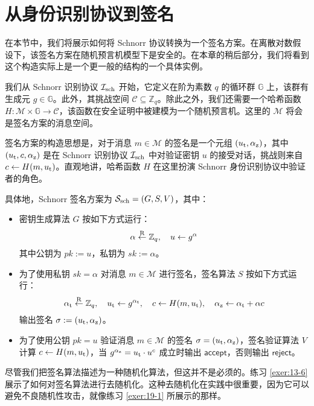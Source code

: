 \section{从身份识别协议到签名}\label{sec:19-2}

在本节中，我们将展示如何将 Schnorr 协议转换为一个签名方案。在离散对数假设下，该签名方案在随机预言机模型下是安全的。在本章的稍后部分，我们将看到这个构造实际上是一个更一般的结构的一个具体实例。

我们从 Schnorr 识别协议 $\mathcal{I}_{\rm sch}$ 开始，它定义在阶为素数 $q$ 的循环群 $\mathbb{G}$ 上，该群有生成元 $g\in\mathbb{G}$。此外，其挑战空间 $\mathcal{C}\subseteq\mathbb{Z}_q$。除此之外，我们还需要一个哈希函数 $H:\mathcal{M}\times\mathbb{G}\to\mathcal{C}$，该函数在安全证明中被建模为一个随机预言机。这里的 $\mathcal{M}$ 将会是签名方案的消息空间。

签名方案的构造思想是，对于消息 $m\in\mathcal{M}$ 的签名是一个元组 $(u_{\rm t},\alpha_{\rm z})$，其中 $(u_{\rm t},c,\alpha_{\rm z})$ 是在 Schnorr 识别协议 $\mathcal{I}_{\rm sch}$ 中对验证密钥 $u$ 的接受对话，挑战则来自 $c\leftarrow H(m,u_{\rm t})$。直观地讲，哈希函数 $H$ 在这里扮演 Schnorr 身份识别协议中验证者的角色。

具体地，Schnorr 签名方案为 $\mathcal{S}_{\rm sch}=(G,S,V)$，其中：
\begin{itemize}
	\item 密钥生成算法 $G$ 按如下方式运行：
	    \[
	    \alpha\overset{\rm R}\leftarrow\mathbb{Z}_q,
	    \quad
	    u\leftarrow g^\alpha
	    \]
	    其中公钥为 $pk:=u$，私钥为 $sk:=\alpha$。
	\item 为了使用私钥 $sk=\alpha$ 对消息 $m\in\mathcal{M}$ 进行签名，签名算法 $S$ 按如下方式运行：
		\[
		\alpha_{\rm t}\overset{\rm R}\leftarrow\mathbb{Z}_q,
		\quad	
		u_{\rm t}\leftarrow g^{\alpha_{\rm t}},
		\quad
		c\leftarrow H(m,u_{\rm t}),
		\quad
		\alpha_{\rm z}\leftarrow\alpha_{\rm t}+\alpha c
		\]
		输出签名 $\sigma:=(u_{\rm t},\alpha_{\rm z})$。
	\item 为了使用公钥 $pk=u$ 验证消息 $m\in\mathcal{M}$ 的签名 $\sigma=(u_{\rm t},\alpha_{\rm z})$，签名验证算法 $V$ 计算 $c\leftarrow H(m,u_{\rm t})$，当 $g^{\alpha_{\rm z}}=u_{\rm t}\cdot u^c$ 成立时输出 $\mathsf{accept}$，否则输出 $\mathsf{reject}$。
\end{itemize}

尽管我们把签名算法描述为一种随机化算法，但这并不是必须的。练习 \ref{exer:13-6} 展示了如何对签名算法进行去随机化。这种去随机化在实践中很重要，因为它可以避免不良随机性攻击，就像练习 \ref{exer:19-1} 所展示的那样。

